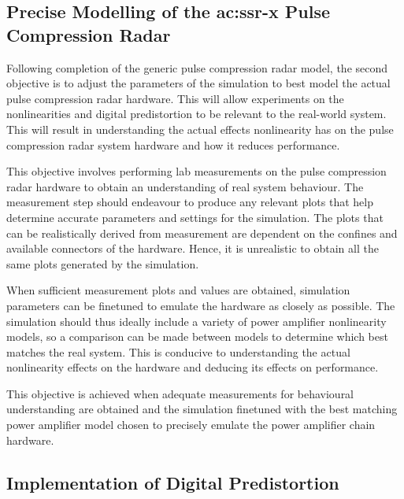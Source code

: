 \subsection{Precise Modelling of the \gls{ac:ssr-x} Pulse Compression Radar}

Following completion of the generic pulse compression radar model, the second objective is to adjust the parameters of the simulation to best model the actual pulse compression radar hardware. This will allow experiments on the nonlinearities and digital predistortion to be relevant to the real-world system. This will result in understanding the actual effects nonlinearity has on the pulse compression radar system hardware and how it reduces performance.

This objective involves performing lab measurements on the pulse compression radar hardware to obtain an understanding of real system behaviour. The measurement step should endeavour to produce any relevant plots that help determine accurate parameters and settings for the simulation. The plots that can be realistically derived from measurement are dependent on the confines and available connectors of the hardware. Hence, it is unrealistic to obtain all the same plots generated by the simulation. 

When sufficient measurement plots and values are obtained, simulation parameters can be finetuned to emulate the hardware as closely as possible. The simulation should thus ideally include a variety of power amplifier nonlinearity models, so a comparison can be made between models to determine which best matches the real system. This is conducive to understanding the actual nonlinearity effects on the hardware and deducing its effects on performance.

This objective is achieved when adequate measurements for behavioural understanding are obtained and the simulation finetuned with the best matching power amplifier model chosen to precisely emulate the power amplifier chain hardware. 

\subsection{Implementation of Digital Predistortion}

